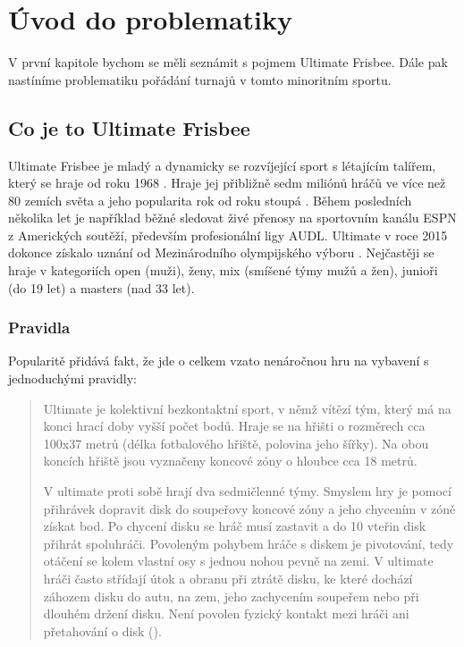 \chapter{Úvod do problematiky}

\indent

V první kapitole bychom se měli seznámit s pojmem Ultimate Frisbee. Dále pak nastíníme
problematiku pořádání turnajů v tomto minoritním sportu.

\section{Co je to Ultimate Frisbee}

\indent

Ultimate Frisbee je mladý a dynamicky se rozvíjející sport s létajícím talířem,
který se hraje od roku 1968 \cite{cald-ultimate}. Hraje jej přibližně sedm miliónů
hráčů ve více než 80 zemích světa a jeho popularita rok od roku stoupá \cite{usa-ultimate}.
Během posledních několika let je například běžné sledovat živé přenosy na sportovním kanálu ESPN
z Amerických soutěží, především profesionální ligy AUDL. Ultimate v roce 2015 dokonce získalo
uznání od Mezinárodního olympijského výboru \cite{cald-uznani}. Nejčastěji se hraje v kategoriích
open (muži), ženy, mix (smíšené týmy mužů a žen), junioři (do 19 let) a masters (nad 33 let).

\subsection{Pravidla}

\indent

Popularitě přidává fakt, že jde o celkem vzato nenáročnou hru na vybavení s jednoduchými pravidly:

\begin{quote}
Ultimate je kolektivní bezkontaktní sport, v němž vítězí tým, který má na konci hrací doby
vyšší počet bodů. Hraje se na hřišti o rozměrech cca 100x37 metrů (délka fotbalového hřiště,
polovina jeho šířky). Na obou koncích hřiště jsou vyznačeny koncové zóny o hloubce cca 18 metrů.

V ultimate proti sobě hrají dva sedmičlenné týmy. Smyslem hry je pomocí přihrávek dopravit disk
do soupeřovy koncové zóny a jeho chycením v zóně získat bod. Po chycení disku se hráč musí
zastavit a do 10 vteřin disk přihrát spoluhráči. Povoleným pohybem hráče s diskem je pivotování,
tedy otáčení se kolem vlastní osy s jednou nohou pevně na zemi. V ultimate hráči často střídají
útok a obranu při ztrátě disku, ke které dochází záhozem disku do autu, na zem, jeho zachycením
soupeřem nebo při dlouhém držení disku. Není povolen fyzický kontakt mezi hráči ani přetahování
o disk (\cite{cald-ultimate}).
\end{quote}


